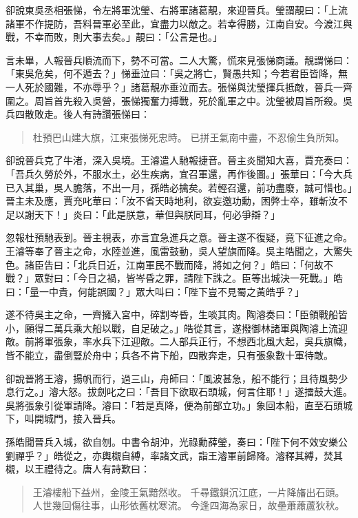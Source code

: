 卻說東吳丞相張悌，令左將軍沈瑩、右將軍諸葛靚，來迎晉兵。瑩謂靚曰：「上流諸軍不作提防，吾料晉軍必至此，宜盡力以敵之。若幸得勝，江南自安。今渡江與戰，不幸而敗，則大事去矣。」靚曰：「公言是也。」

言未畢，人報晉兵順流而下，勢不可當。二人大驚，慌來見張悌商議。靚謂悌曰：「東吳危矣，何不遁去？」悌垂泣曰：「吳之將亡，賢愚共知；今若君臣皆降，無一人死於國難，不亦辱乎？」諸葛靚亦垂泣而去。張悌與沈瑩揮兵抵敵，晉兵一齊圍之。周旨首先殺入吳營，張悌獨奮力搏戰，死於亂軍之中。沈瑩被周旨所殺。吳兵四散敗走。後人有詩讚張悌曰：

\begin{quote}
杜預巴山建大旗，江東張悌死忠時。
已拼王氣南中盡，不忍偷生負所知。
\end{quote}

卻說晉兵克了牛渚，深入吳境。王濬遣人馳報捷音。晉主炎聞知大喜，賈充奏曰：「吾兵久勞於外，不服水土，必生疾病，宜召軍還，再作後圖。」張華曰：「今大兵已入其巢，吳人膽落，不出一月，孫皓必擒矣。若輕召還，前功盡廢，誠可惜也。」晉主未及應，賈充叱華曰：「汝不省天時地利，欲妄邀功勳，困弊士卒，雖斬汝不足以謝天下！」炎曰：「此是朕意，華但與朕同耳，何必爭辯？」

忽報杜預馳表到。晉主視表，亦言宜急進兵之意。晉主遂不復疑，竟下征進之命。王濬等奉了晉主之命，水陸並進，風雷鼓動，吳人望旗而降。吳主皓聞之，大驚失色。諸臣告曰：「北兵日近，江南軍民不戰而降，將如之何？」皓曰：「何故不戰？」眾對曰：「今日之禍，皆岑昏之罪，請陛下誅之。臣等出城決一死戰。」皓曰：「量一中貴，何能誤國？」眾大叫曰：「陛下豈不見蜀之黃皓乎？」

遂不待吳主之命，一齊擁入宮中，碎割岑昏，生啖其肉。陶濬奏曰：「臣領戰船皆小，願得二萬兵乘大船以戰，自足破之。」皓從其言，遂撥御林諸軍與陶濬上流迎敵。前將軍張象，率水兵下江迎敵。二人部兵正行，不想西北風大起，吳兵旗幟，皆不能立，盡倒豎於舟中；兵各不肯下船，四散奔走，只有張象數十軍待敵。

卻說晉將王濬，揚帆而行，過三山，舟師曰：「風波甚急，船不能行；且待風勢少息行之。」濬大怒。拔劍叱之曰：「吾目下欲取石頭城，何言住耶！」遂擂鼓大進。吳將張象引從軍請降。濬曰：「若是真降，便為前部立功。」象回本船，直至石頭城下，叫開城門，接入晉兵。

孫皓聞晉兵入城，欲自刎。中書令胡沖，光祿勳薛瑩，奏曰：「陛下何不效安樂公劉禪乎？」皓從之，亦輿櫬自縛，率諸文武，詣王濬軍前歸降。濬釋其縛，焚其櫬，以王禮待之。唐人有詩歎曰：

\begin{quote}
王濬樓船下益州，金陵王氣黯然收。
千尋鐵鎖沉江底，一片降旛出石頭。
人世幾回傷往事，山形依舊枕寒流。
今逢四海為家日，故壘蕭蕭蘆狄秋。
\end{quote}

